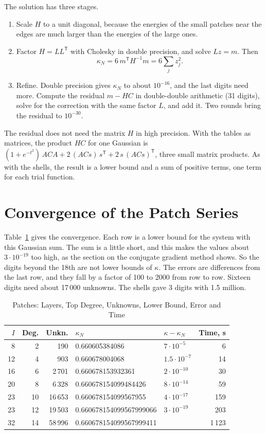 \documentclass[journal]{IEEEtran}
\newcommand{\T}{\mathsf T}
\begin{document}
The solution has three stages.
\begin{enumerate}
\item Scale $H$ to a unit diagonal, because the energies of the small patches near the edges are much larger than the energies of the large ones.
\item Factor $H = LL^{\T}$ with Cholesky in double precision, and solve $Lz = m$. Then
\begin{equation}
\kappa_N = 6\, m^{\T} H^{-1} m = 6 \sum_j z_j^2 .
\end{equation}
\item Refine. Double precision gives $\kappa_N$ to about $10^{-16}$, and the last digits need more. Compute the residual $m - HC$ in double-double arithmetic (31 digits), solve for the correction with the same factor $L$, and add it. Two rounds bring the residual to $10^{-30}$.
\end{enumerate}

The residual does not need the matrix $H$ in high precision. With the tables as matrices, the product $HC$ for one Gaussian is $(1 + e^{-t^2})\,A C A + 2\,(A C s)\,s^{\T} + 2\,s\,(A C s)^{\T}$, three small matrix products. As with the shells, the result is a lower bound and a sum of positive terms, one term for each trial function.

\section{Convergence of the Patch Series}
Table~\ref{tab:patches} gives the convergence. Each row is a lower bound for the system with this Gaussian sum. The sum is a little short, and this makes the values about $3\cdot10^{-19}$ too high, as the section on the conjugate gradient method shows. So the digits beyond the 18th are not lower bounds of $\kappa$. The errors are differences from the last row, and they fall by a factor of 100 to 2000 from row to row. Sixteen digits need about 17\,000 unknowns. The shells gave 3 digits with 1.5 million.

\begin{table}[!t]
\caption{Patches: Layers, Top Degree, Unknowns, Lower Bound, Error and Time}
\label{tab:patches}
\centering
\footnotesize
\setlength{\tabcolsep}{3pt}
\begin{tabular}{rrrllr}
\toprule
$I$ & Deg. & Unkn. & $\kappa_N$ & $\kappa-\kappa_N$ & Time, s\\
\midrule
8 & 2 & 190 & 0.660605384086 & $7\cdot10^{-5}$ & 6\\
12 & 4 & 903 & 0.660678004068 & $1.5\cdot10^{-7}$ & 14\\
16 & 6 & 2\,701 & 0.660678153932361 & $2\cdot10^{-10}$ & 30\\
20 & 8 & 6\,328 & 0.660678154099484426 & $8\cdot10^{-14}$ & 59\\
23 & 10 & 16\,653 & 0.660678154099567955 & $4\cdot10^{-17}$ & 159\\
23 & 12 & 19\,503 & 0.660678154099567999066 & $3\cdot10^{-19}$ & 203\\
32 & 14 & 58\,996 & 0.660678154099567999411 & & 1\,123\\
\bottomrule
\end{tabular}
\end{table}
\end{document}
